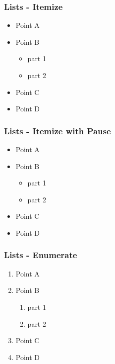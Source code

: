 
\label{itemize}
\begin{frame}\frametitle{Lists - Itemize}
  \begin{itemize}
    \item Point A
    \item Point B
    \begin{itemize}
      \item part 1
      \item part 2
    \end{itemize}
    \item Point C
    \item Point D
  \end{itemize}
\end{frame}

\label{pause}
\begin{frame}\frametitle{Lists - Itemize with Pause}
  \begin{itemize}
    \pause \item Point A
    \pause \item Point B
    \begin{itemize}
      \pause \item part 1
      \pause \item part 2
    \end{itemize}
    \pause \item Point C
    \pause \item Point D
  \end{itemize}
\end{frame}

\label{enumerate}
\begin{frame}\frametitle{Lists - Enumerate}
  \begin{enumerate}
    \item Point A
    \item Point B
    \begin{enumerate}
      \item part 1
      \item part 2
    \end{enumerate}
    \item Point C
    \item Point D
  \end{enumerate}
\end{frame}

